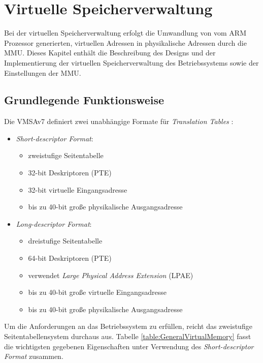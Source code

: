 \section{Virtuelle Speicherverwaltung}
\label{chapVirtualMemory}
Bei der virtuellen Speicherverwaltung erfolgt die Umwandlung von vom ARM Prozessor generierten, virtuellen Adressen in physikalische Adressen durch die \ac{MMU}. Dieses Kapitel enthält die Beschreibung des Designs und der Implementierung der virtuellen Speicherverwaltung des Betriebssystems sowie der Einstellungen der \ac{MMU}.\\

\subsection{Grundlegende Funktionsweise}

Die \ac{VMSAv7} definiert zwei unabhängige Formate für \textit{Translation Tables} \cite[S. B3-1318]{ARM:ARM}:

\begin{itemize}
	\item \emph{Short-descriptor Format}:
	\begin{itemize}
		\item zweistufige Seitentabelle 
		\item 32-bit Deskriptoren (PTE)
		\item 32-bit virtuelle Eingangsadresse 
		\item bis zu 40-bit große physikalische Ausgangsadresse
	\end{itemize}
	\item \emph{Long-descriptor Format}:
	\begin{itemize}
		\item dreistufige Seitentabelle
		\item 64-bit Deskriptoren (\acs{PTE})
		\item verwendet \emph{Large Physical Address Extension} (LPAE)
		\item bis zu 40-bit große virtuelle Eingangsadresse 
		\item bis zu 40-bit große physikalische Ausgangsadresse
	\end{itemize}
\end{itemize}

Um die Anforderungen an das Betriebssystem zu erfüllen, reicht das zweistufige Seitentabellensystem durchaus aus. Tabelle \ref{table:GeneralVirtualMemory} fasst die wichtigsten gegebenen Eigenschaften unter Verwendung des \textit{Short-descriptor Format} zusammen.\\


